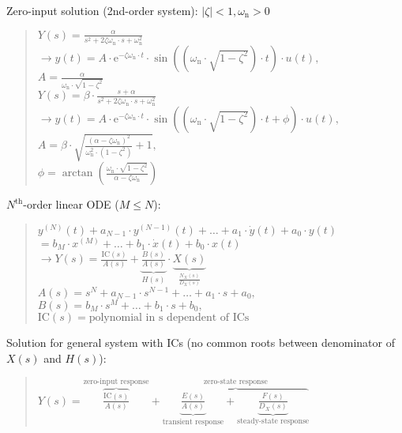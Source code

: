 \documentclass[fontsize=9pt,a4paper,twocolumn]{scrartcl}
\begin{document}
Zero-input solution (2nd-order system): $|\zeta|<1, \omega_\mathrm{n}>0$
\begin{quote}
	$Y(s)=\frac{\alpha}{s^2+2\zeta\omega_\mathrm{n}\cdot s+\omega_\mathrm{n}^2}$\\
	$\to y(t)=A\cdot\mathrm{e}^{-\zeta\omega_\mathrm{n}\cdot t}\cdot\sin\left(\left(\omega_\mathrm{n}\cdot\sqrt{1-\zeta^2}\right)\cdot t\right)\cdot u(t),$\\
	\hspace*{1.5cm}$A=\frac{\alpha}{\omega_\mathrm{n}\cdot\sqrt{1-\zeta^2}}$\\
	$Y(s)=\beta\cdot\frac{s+\alpha}{s^2+2\zeta\omega_\mathrm{n}\cdot s+\omega_\mathrm{n}^2}$\\
	$\to y(t)=A\cdot\mathrm{e}^{-\zeta\omega_\mathrm{n}\cdot t}\cdot\sin\left(\left(\omega_\mathrm{n}\cdot\sqrt{1-\zeta^2}\right)\cdot t+\phi\right)\cdot u(t),$\\
	\hspace*{1.5cm}$A=\beta\cdot\sqrt{\frac{(\alpha-\zeta\omega_\mathrm{n})^2}{\omega_\mathrm{n}^2\cdot(1-\zeta^2)}+1},$\\\hspace*{1.5cm}$\phi=\arctan\left(\frac{\omega_\mathrm{n}\cdot\sqrt{1-\zeta^2}}{\alpha-\zeta\omega_\mathrm{n}}\right)$
\end{quote}

$N^\mathrm{th}$-order linear ODE ($M\leq N$):
\begin{quote}
	$y^{(N)}(t)+a_{N-1}\cdot y^{(N-1)}(t)+\dots+a_1\cdot\dot y(t)+a_0\cdot y(t)$\vspace*{0.2cm}\\
	\hspace*{0.5cm}$=b_M\cdot x^{(M)}+\dots+b_1\cdot\dot x(t)+b_0\cdot x(t)$\vspace*{0.25cm}\\
	$\boxed{\to Y(s)=\frac{\mathrm{IC}(s)}{A(s)}+\underbrace{\frac{B(s)}{A(s)}}_{H(s)}\cdot \underbrace{X(s)}_{\frac{N_X(s)}{D_X(s)}}}$\vspace*{0.2cm}\\
	\hspace*{0.5cm}$A(s)=s^N+a_{N-1}\cdot s^{N-1}+\dots+a_1\cdot s+a_0,$\\
	\hspace*{0.5cm}$B(s)=b_M\cdot s^M+\dots+b_1\cdot s+b_0,$\\
	\hspace*{0.5cm}$\mathrm{IC}(s)=\text{polynomial in s dependent of ICs}$
\end{quote}

Solution for general system with ICs (no common roots between denominator of $X(s)$ and $H(s)$):
\begin{quote}
	$\boxed{Y(s)=\overbrace{\frac{\mathrm{IC}(s)}{A(s)}}^\text{zero-input response}+\overbrace{\underbrace{\frac{E(s)}{A(s)}}_\text{transient response}+\underbrace{\frac{F(s)}{D_X(s)}}_\text{steady-state response}}^\text{zero-state response}}$
\end{quote}
\end{document}
